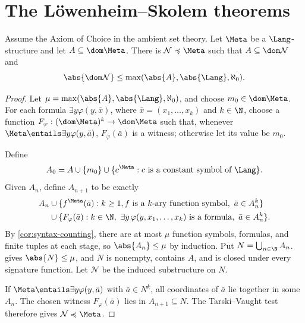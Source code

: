 \section{The L\"owenheim--Skolem theorems}
\label{sec:fol-cardinality-normalforms-02}

\begin{theorem}
\label{thm:downward-ls}
Assume the Axiom of Choice in the ambient set theory.  Let \(\Meta\) be a
\(\Lang\)-structure and let
\(A\subseteq\dom\Meta\).  There is
\(\mathcal N\preccurlyeq\Meta\) such that \(A\subseteq\dom\mathcal N\) and
\[
 \abs{\dom\mathcal N}
 \leq\max(\abs{A},\abs{\Lang},\aleph_0).
\]
\end{theorem}
\begin{proof}
Let \(\mu=\max(\abs{A},\abs{\Lang},\aleph_0)\), and choose
\(m_0\in\dom\Meta\).  For each formula
\(\exists y\varphi(y,\bar x)\), where
\(\bar x=(x_1,\ldots,x_k)\) and \(k\in\N\), choose a function
\(F_\varphi:(\dom\Meta)^{k}\to\dom\Meta\) such that, whenever
\(\Meta\entails\exists y\varphi(y,\bar a)\),
\(F_\varphi(\bar a)\) is a witness; otherwise let its value be \(m_0\).

Define
\[
 A_0=A\cup\{m_0\}\cup
 \{c^{\Meta}:c\text{ is a constant symbol of }\Lang\}.
\]
Given \(A_n\), define \(A_{n+1}\) to be exactly
\[
\begin{aligned}
 A_n
 &\cup\{f^{\Meta}(\bar a): k\geq1, f\text{ is a }k\text{-ary function
       symbol},\ \bar a\in A_n^k\}\\
 &\cup\{F_\varphi(\bar a): k\in\N,
       \ \exists y\,\varphi(y,x_1,\ldots,x_k)\text{ is a formula},
       \ \bar a\in A_n^k\}.
\end{aligned}
\]
By
\cref{cor:syntax-counting}, there are at most \(\mu\) function
symbols, formulas, and finite tuples at each stage, so
\(\abs{A_n}\leq\mu\) by induction.  Put
\(N=\bigcup_{n\in\N}A_n\).   gives
\(\abs{N}\leq\mu\), and \(N\) is nonempty,
contains \(A\), and is closed under every signature function.  Let
\(\mathcal N\) be the induced substructure on \(N\).

If \(\Meta\entails\exists y\varphi(y,\bar a)\) with \(\bar a\in N^k\), all
coordinates of \(\bar a\) lie together in some \(A_n\).  The chosen witness
\(F_\varphi(\bar a)\) lies in \(A_{n+1}\subseteq N\).  The Tarski--Vaught test
therefore gives \(\mathcal N\preccurlyeq\Meta\).
\end{proof}

